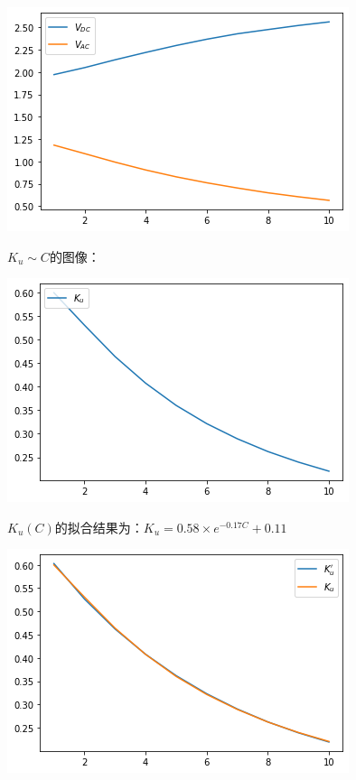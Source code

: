 \documentclass[a4paper]{ltxdoc}
\newenvironment{Figure}
{\par\medskip\noindent\minipage{\linewidth}}
{\endminipage\par\medskip}
\begin{document}
\begin{multicols}{2}
    \begin{Figure}
        \centering
        \includegraphics[width=0.8\linewidth]{img/8.png}
    \end{Figure}

    \noindent
    $K_u \sim C$的图像：

    \begin{Figure}
        \centering
        \includegraphics[width=0.8\linewidth]{img/9.png}
    \end{Figure}

    $K_u(C)$的拟合结果为：$K_u = 0.58 \times e^{-0.17 C} + 0.11$
    \begin{Figure}
        \centering
        \includegraphics[width=0.8\linewidth]{img/10.png}
    \end{Figure}


\end{multicols}
\end{document}
